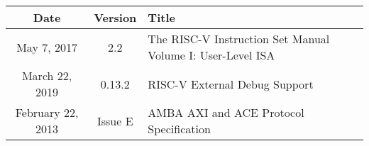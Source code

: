 \begin{center}
{
  \vspace{0.5em}
  \small
  \begin{tabularx}{0.9\textwidth}{|c|c|X|}
    \hline
    \textbf{Date} & \textbf{Version} & \textbf{Title} \\
    \hline
    \hline
    May 7, 2017 & 2.2 & The RISC-V Instruction Set Manual Volume I: User-Level ISA \\
    \hline
    March 22, 2019 & 0.13.2 & RISC-V External Debug Support \\
    \hline
    February 22, 2013 & Issue E & AMBA AXI and ACE Protocol Specification \\
    \hline
  \end{tabularx}
  \vspace{0.5em}
}
\end{center}

\newpage
